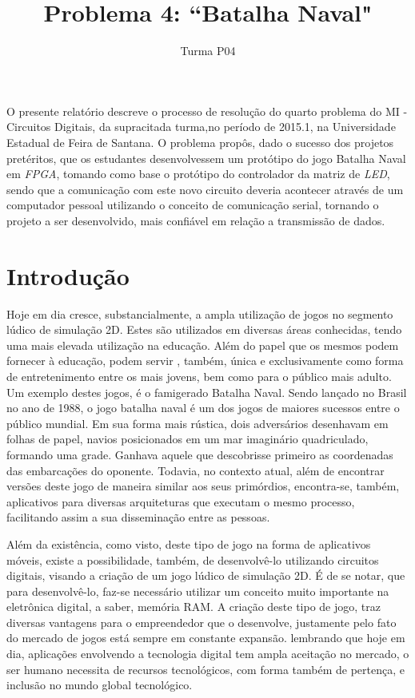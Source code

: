 \documentclass[12pt]{article}
\title{Problema 4: ``Batalha Naval"}
\author{Turma P04}
\begin{document}
 

\maketitle

\begin{resumo} 
O presente relatório descreve o processo de resolução do quarto problema do MI - Circuitos Digitais, da supracitada turma,no período de 2015.1, na Universidade Estadual de Feira de Santana. O problema propôs, dado o sucesso dos projetos pretéritos, que os estudantes desenvolvessem um protótipo do jogo Batalha Naval em \textit{FPGA}, tomando como base o  protótipo do controlador da matriz de \textit{LED}, sendo que a comunicação com este novo circuito deveria acontecer através de um computador pessoal utilizando o conceito de comunicação serial, tornando o projeto a ser desenvolvido, mais confiável em relação a transmissão de dados.
\end{resumo}

\section{Introdução}
Hoje em dia cresce, substancialmente, a ampla utilização de jogos no segmento lúdico de simulação 2D. Estes são utilizados em diversas áreas conhecidas, tendo uma mais elevada utilização na educação. Além do papel que os mesmos podem fornecer à educação, podem servir , também, única e exclusivamente como forma de entretenimento entre os mais jovens, bem como para o público mais adulto. Um exemplo destes jogos, é o famigerado Batalha Naval. Sendo lançado no Brasil no ano de 1988, o jogo batalha naval é um dos jogos de maiores sucessos entre o público mundial. Em sua forma mais rústica, dois adversários desenhavam em folhas de papel, navios posicionados em um mar imaginário quadriculado, formando uma grade. Ganhava aquele que descobrisse primeiro as coordenadas das embarcações do oponente. Todavia, no contexto atual, além de encontrar versões deste jogo de maneira similar aos seus primórdios, encontra-se, também, aplicativos para diversas arquiteturas que executam o mesmo processo, facilitando assim a sua disseminação entre as pessoas.

Além da existência, como visto, deste tipo de jogo na forma de aplicativos móveis, existe a possibilidade, também, de desenvolvê-lo utilizando circuitos digitais, visando a criação de um jogo lúdico de simulação 2D.  É de se notar, que para desenvolvê-lo, faz-se necessário utilizar um conceito muito importante na eletrônica digital, a saber, memória RAM. A criação deste tipo de jogo, traz diversas vantagens para o empreendedor que o desenvolve, justamente pelo fato do mercado de jogos está sempre em constante expansão. lembrando que hoje em dia, aplicações envolvendo a tecnologia digital tem ampla aceitação no mercado, o ser humano necessita de recursos tecnológicos, com forma também de pertença, e inclusão no mundo global tecnológico. 
\end{document}
